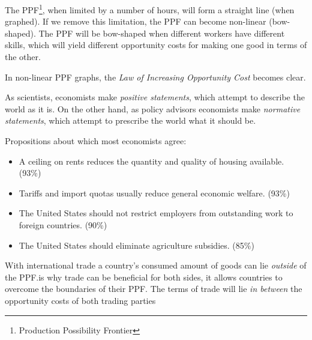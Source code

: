 \documentclass{article}
\begin{document}
    \begin{spacing}{1.2}
    \newpage
    The PPF\footnote{Production Possibility Frontier}, when limited by a number
    of hours, will form a straight line (when graphed). If we remove this
    limitation, the PPF can become non-linear (bow-shaped). The PPF will be
    bow-shaped when different workers have different skills, which will yield
    different opportunity costs for making one good in terms of the other.
    
    In non-linear PPF graphs, the \emph{Law of Increasing 
    Opportunity Cost} becomes clear.
    
    As scientists, economists make \emph{positive statements}, which attempt to
    describe the world as it is. On the other hand, as policy advisors
    economists make \emph{normative statements}, which attempt to prescribe the
    world what it should be.

    Propositions about which most economists agree:
    \begin{itemize}
        \item A ceiling on rents reduces the quantity and quality of housing
        available. (93\%)
        \item Tariffs and import quotas usually reduce general economic
        welfare. (93\%)
        \item The United States should not restrict employers from outstanding
        work to foreign countries. (90\%)
        \item The United States should eliminate agriculture subsidies. (85\%)
    \end{itemize}

    With international trade a country's consumed amount of goods can lie 
    \emph{outside} of the PPF.\@This is why trade can be beneficial for both
    sides, it allows countries to overcome the boundaries of their PPF. The 
    terms of trade will lie \emph{in between} the opportunity costs of both
    trading parties


    \end{spacing}
    
\end{document}
